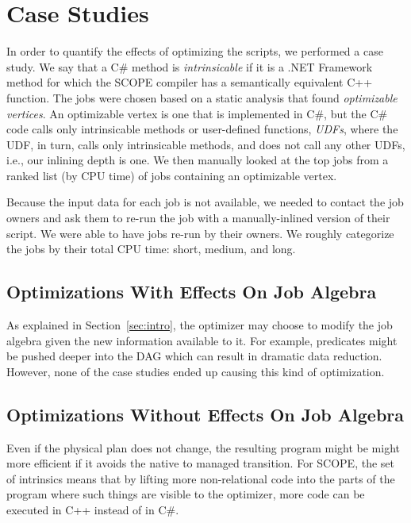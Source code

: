\section{Case Studies}
\label{sec:caseStudy}
In order to quantify the effects of optimizing the scripts, we performed a case study.
We say that a C\# method is {\em intrinsicable} if it is a .NET Framework method for which the SCOPE compiler has a semantically equivalent C++ function.
The jobs were chosen based on a static analysis that found {\em optimizable vertices}.
An optimizable vertex is one that is implemented in C\#, but the C\# code calls only intrinsicable methods or user-defined functions, {\em UDFs}, where the UDF, in turn, calls only intrinsicable methods, and does not call any other UDFs, i.e., our inlining depth is one.
We then manually looked at the top jobs from  a ranked list (by CPU time) of jobs containing an optimizable vertex.

Because the input data for each job is not available, we needed to contact the job owners and ask them to re-run the job with a manually-inlined version of their script.
We were able to have \casestudyjobs{} jobs re-run by their owners.
We roughly categorize the jobs by their total CPU time: short, medium, and long.

\subsection{Optimizations With Effects On Job Algebra}
As explained in Section~\ref{sec:intro}, the optimizer may choose to modify the job algebra given the new information available to it.
For example, predicates might be pushed deeper into the DAG which can result in dramatic data reduction.
However, none of the case studies ended up causing this kind of optimization.


\subsection{Optimizations Without Effects On Job Algebra}
Even if the physical plan does not change, the resulting program might be might more efficient if it avoids the native to managed transition.
For SCOPE, the set of intrinsics means that by lifting more non-relational code into the parts of the program where such things are visible to the optimizer, more code can be executed in C++ instead of in C\#.

